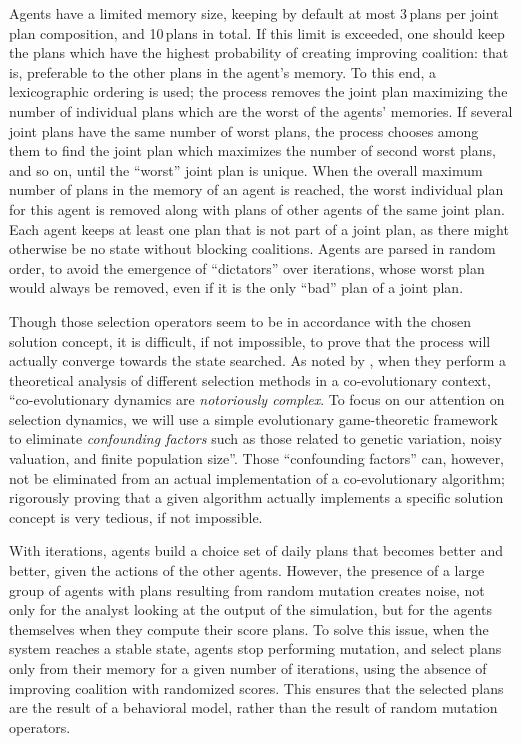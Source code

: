 {Agents have a limited memory size, keeping by default at most 3\,plans per joint plan composition, and 10\,plans in total. If this limit is exceeded, one should keep the plans which have the highest probability of creating improving coalition: that is, preferable to the other plans in the agent's memory. To this end, a lexicographic ordering is used; the process removes the joint plan  maximizing the number of individual plans which are the worst of the agents' memories. If several joint plans have the same number of worst plans, the process chooses among them to find the joint plan which maximizes the number of second worst plans, and so on, until the ``worst'' joint plan is unique. When the overall maximum number of plans in the memory of an agent is reached, the worst individual plan for this agent is removed along with plans of other agents of the same joint plan. Each agent keeps at least one plan that is not part of a joint plan, as there might otherwise be no state without blocking coalitions. Agents are parsed in random order, to avoid the emergence of ``dictators'' over iterations, whose worst plan would always be removed, even if it is the only ``bad'' plan of a joint plan.

Though those selection operators seem to be in accordance with the chosen solution concept, it is difficult, if not impossible, to prove that the process will actually converge towards the state searched. As noted by \citet{FiciciEtAl_ITEC_2005}, when they perform a theoretical analysis of different selection methods in a co-evolutionary context, ``co-evolutionary dynamics are \emph{notoriously complex}. To focus on our attention on selection dynamics, we will use a simple evolutionary game-theoretic framework to eliminate \emph{confounding factors} such as those related to genetic variation, noisy  valuation, and finite population size''. Those ``confounding factors'' can, however, not be eliminated from an actual implementation of a co-evolutionary algorithm; rigorously proving that a given algorithm actually implements a specific solution concept is very tedious, if not impossible.

With iterations, agents build a choice set of daily plans that becomes better and better, given the actions of the other agents. However, the presence of a large group of agents with plans resulting from random mutation creates noise, not only for the analyst looking at the output of the simulation, but for the agents themselves when they compute their score plans. To solve this issue, when the system reaches a stable state, agents stop performing mutation, and select plans only from their memory for a given number of iterations, using the absence of improving coalition with randomized scores. This ensures that the selected plans are the result of a behavioral model, rather than the result of random mutation operators.

}
